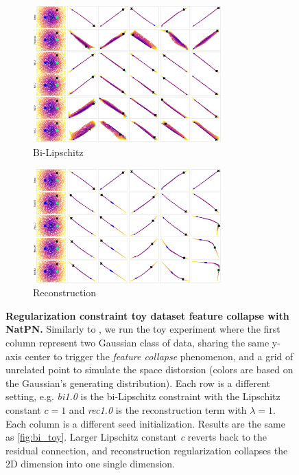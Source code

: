 \begin{figure}[!htb]
    \label{fig:toy}
\end{figure}

\begin{figure}[!htb]
    \begin{subfigure}[b]{\textwidth}
        \centering
        \includegraphics[width=0.8\textwidth]{sections/008_iclr2023/figures/toy/blob2/bi_collapse.png}
        \caption{Bi-Lipschitz}
        \label{fig:bi_toy_collapse}
    \end{subfigure}
    \begin{subfigure}[b]{\textwidth}
        \centering
        \includegraphics[width=0.8\textwidth]{sections/008_iclr2023/figures/toy/blob2/rec_collapse.png}
        \caption{Reconstruction}
        \label{fig:rec_toy_collapse}
    \end{subfigure}
    \caption{\textbf{Regularization constraint toy dataset feature collapse with NatPN.} Similarly to \citep{van2021due}, we run the toy experiment where the first column represent two Gaussian class of data, sharing the same y-axis center to trigger the \textit{feature collapse} phenomenon, and a grid of unrelated point to simulate the space distorsion (colors are based on the Gaussian's generating distribution). 
    Each row is a different setting, e.g. \textit{bi1.0} is the bi-Lipschitz constraint with the Lipschitz constant $c = 1$ and \textit{rec1.0} is the reconstruction term with $\lambda=1$. Each column is a different seed initialization. Results are the same as \ref{fig:bi_toy}. Larger Lipschitz constant \textit{c} reverts back to the residual connection, and reconstruction regularization collapses the 2D dimension into one single dimension. }
    \label{fig:toy_collpase}
\end{figure}


